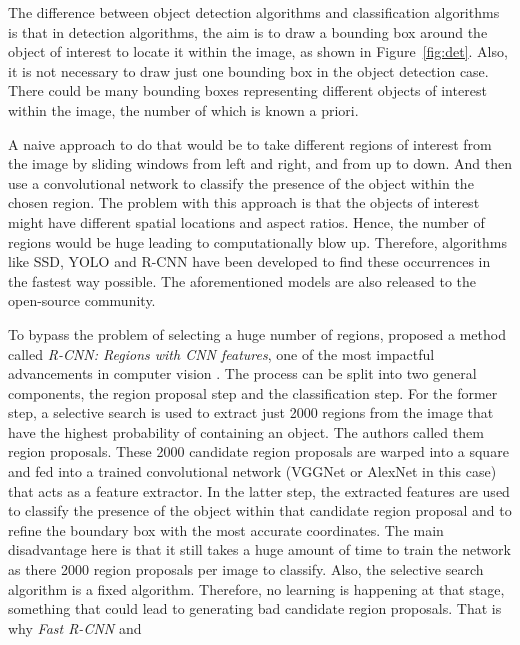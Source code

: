 \documentclass[12pt,a4paper]{report}
\newcommand{\term}{\textit}
\newcommand{\acronym}{\MakeUppercase}
\begin{document}
	The difference between object detection algorithms and classification algorithms 
	is that in detection algorithms, the aim is to draw a bounding box around the object 
	of interest to locate it within the image, as shown in Figure~\ref{fig:det}. Also, 
	it is not necessary to draw just one bounding box in the object detection case. There 
	could be many bounding boxes representing different objects of interest within the 
	image, the number of which is known a priori. 
	\par
	A naive approach to do that would be to take different regions of interest from the 
	image by sliding windows from left and right, and from up to down. And then use a 
	convolutional network to classify the presence of the object within the chosen region. 
	The problem with this approach is that the objects of interest might have different 
	spatial locations and aspect ratios. Hence, the number of regions would be huge leading 
	to computationally blow up. Therefore, algorithms like \acronym{ssd}, \acronym{yolo} 
	and \acronym{r-cnn} \citep{Girshick, Redmon, Liu} have been developed to find these 
	occurrences in the fastest way possible. The aforementioned models are also released 
	to the open-source community.
	\par
	To bypass the problem of selecting a huge number of regions, \citet{Girshick} proposed 
	a method called \term{\acronym{r-cnn}: Regions with \acronym{cnn} features}, one of the 
	most impactful advancements in computer vision \citep{Deshpande}. The process can be 
	split into two general components, the region proposal step and the classification step. 
	For the former step, a selective search \citep{Uijlings} is used to extract just 2000 
	regions from the image that have the highest probability of containing an object. The 
	authors called them region proposals. These 2000 candidate region proposals are warped 
	into a square and fed into a trained convolutional network (VGGNet or AlexNet in this case) 
	that acts as a feature extractor. In the latter step, the extracted features are used to 
	classify the presence of the object within that candidate region proposal and to refine 
	the boundary box with the most accurate coordinates. The main disadvantage here is that 
	it still takes a huge amount of time to train the network as there 2000 region proposals 
	per image to classify. Also, the selective search algorithm is a fixed algorithm. Therefore, 
	no learning is happening at that stage, something that could lead to generating bad 
	candidate region proposals. That is why \term{Fast \acronym{r-cnn}} and 
\end{document}
